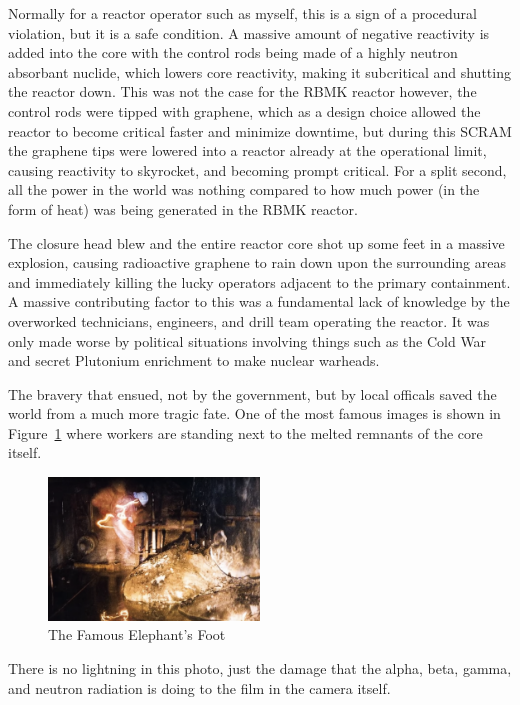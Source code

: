 \documentclass[12pt]{article}
\begin{document}
Normally for a reactor operator such as myself, this is a sign of a procedural violation, but it is a safe condition. A massive amount of negative reactivity is added into the core with the control rods being made of a highly neutron absorbant nuclide, which lowers core reactivity, making it subcritical and shutting the reactor down. This was not the case for the RBMK reactor however, the control rods were tipped with graphene, which as a design choice allowed the reactor to become critical faster and minimize downtime, but during this SCRAM the graphene tips were lowered into a reactor already at the operational limit, causing reactivity to skyrocket, and becoming prompt critical. For a split second, all the power in the world was nothing compared to how much power (in the form of heat) was being generated in the RBMK reactor.

The closure head blew and the entire reactor core shot up some feet in a massive explosion, causing radioactive graphene to rain down upon the surrounding areas and immediately killing the lucky operators adjacent to the primary containment. A massive contributing factor to this was a fundamental lack of knowledge by the overworked technicians, engineers, and drill team operating the reactor. It was only made worse by political situations involving things such as the Cold War and secret Plutonium enrichment to make nuclear warheads.

The bravery that ensued, not by the government, but by local officals saved the world from a much more tragic fate. One of the most famous images is shown in Figure~\ref{fig:elephantsfoot} where workers are standing next to the melted remnants of the core itself.
\begin{figure}[H]
  \centering
  \includegraphics[width=0.5\textwidth]{elephantsfoot.png}
  \caption{The Famous Elephant's Foot}
  \label{fig:elephantsfoot}
\end{figure}
There is no lightning in this photo, just the damage that the alpha, beta, gamma, and neutron radiation is doing to the film in the camera itself.
\end{document}

